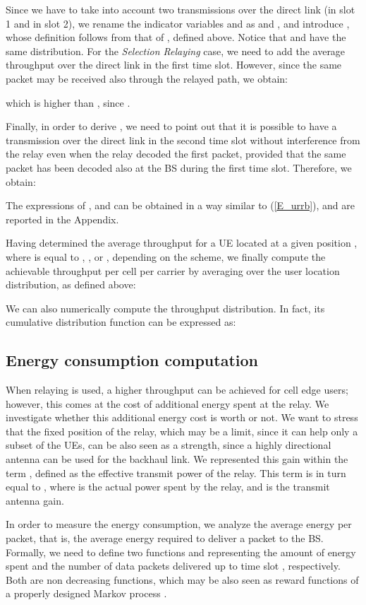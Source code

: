 \documentclass[12pt, letterpaper, onecolumn, draftcls]{IEEEtran}
\begin{document}
Since we have to take into account two transmissions over the direct link (in slot 1 and in slot 2), we rename the indicator variables  and  as  and , and introduce , whose definition follows from that of , defined above. Notice that  and  have the same distribution. For the \textit{Selection Relaying} case, we need to add the average throughput over the direct link in the first time slot. However, since the same packet may be received also through the relayed path, we obtain:

which is higher than , since .

Finally, in order to derive , we need to point out that it is possible to have a transmission over the direct link in the second time slot without interference from the relay even when the relay decoded the first packet, provided that the same packet has been decoded also at the BS during the first time slot. Therefore, we obtain:


The expressions of ,  and  can be obtained in a way similar to (\ref{E_urrb}), and are reported in the Appendix.



Having determined the average throughput  for a UE located at a given position , where  is equal to , ,  or , depending on the scheme, we finally compute the achievable throughput per cell per carrier by averaging over the user location distribution, as defined above:


We can also numerically compute the throughput distribution. In fact, its cumulative distribution function  can be expressed as:


\subsection{Energy consumption computation}
When relaying is used, a higher throughput can be achieved for cell edge users; however, this comes at the cost of additional energy spent at the relay. We investigate whether this additional energy cost is worth or not. We want to stress that the fixed position of the relay, which may be a limit, since it can help only a subset of the UEs, can be also seen as a strength, since a highly directional antenna can be used for the backhaul link. We represented this gain within the term , defined as the effective transmit power of the relay. This term is in turn equal to , where  is the actual power spent by the relay, and  is the transmit antenna gain.

In order to measure the energy consumption, we analyze the average energy per packet, that is, the average energy required to deliver a packet to the BS. Formally, we need to define two functions  and  representing the amount of energy spent and the number of data packets delivered up to time slot , respectively. Both are non decreasing functions, which may be also seen as reward functions of a properly designed Markov process .
\end{document}
